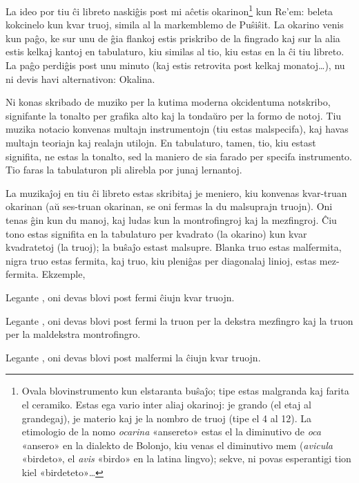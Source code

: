 
La ideo por tiu ĉi libreto naskiĝis post mi aĉetis okarinon\footnote{Ovala blovinstrumento kun elstaranta buŝaĵo; tipe estas malgranda kaj farita el ceramiko. Estas ega vario inter aliaj okarinoj: je grando (el etaj al grandegaj), je materio kaj je la nombro de truoj (tipe el 4 al 12). La etimologio de la nomo \emph{ocarina} «ansereto» estas el la diminutivo de \emph{oca} «ansero» en la dialekto de Bolonjo, kiu venas el diminutivo mem (\emph{avicula} «birdeto», el \emph{avis} «birdo» en la latina lingvo); sekve, ni povas esperantigi tion kiel «birdeteto»…} kun Re’em: beleta kokcinelo kun kvar truoj, simila al la markemblemo de Puŝiŝit. La okarino venis kun paĝo, ke sur unu de ĝia flankoj estis priskribo de la fingrado kaj sur la alia estis kelkaj kantoj en tabulaturo, kiu similas al tio, kiu estas en la ĉi tiu libreto. La paĝo perdiĝis post unu minuto (kaj estis retrovita post kelkaj monatoj…), nu ni devis havi alternativon: Okalina.



Ni konas skribado de muziko per la kutima moderna okcidentuma notskribo, signifante la tonalto per grafika alto kaj la tondaŭro per la formo de notoj. Tiu muzika notacio konvenas multajn instrumentojn (tiu estas malspecifa), kaj havas multajn teoriajn kaj realajn utilojn. En tabulaturo, tamen, tio, kiu estast signifita, ne estas la tonalto, sed la maniero de sia farado per specifa instrumento. Tio faras la tabulaturon pli alirebla por junaj lernantoj.

La muzikaĵoj en tiu ĉi libreto estas skribitaj je meniero, kiu konvenas kvar-truan okarinan (aŭ ses-truan okarinan, se oni fermas la du malsuprajn truojn). Oni tenas ĝin kun du manoj, kaj ludas kun la montrofingroj kaj la mezfingroj. Ĉiu tono estas signifita en la tabulaturo per kvadrato (la okarino) kun kvar kvadratetoj (la truoj); la buŝaĵo estast malsupre. Blanka truo estas malfermita, nigra truo estas fermita, kaj truo, kiu pleniĝas per diagonalaj linioj, estas mez-fermita. Ekzemple,

\begin{compactitem}
	\item Legante \enliniatabulaturo{\c}, oni devas blovi post fermi ĉiujn kvar truojn.
	\item Legante \enliniatabulaturo{\gis}, oni devas blovi post fermi la truon per la dekstra mezfingro kaj la truon per la maldekstra montrofingro.
	\item Legante \enliniatabulaturo{\C}, oni devas blovi post malfermi la ĉiujn kvar truojn.
\end{compactitem}

